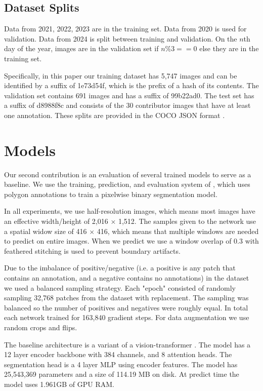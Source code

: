 \documentclass[10pt,twocolumn,letterpaper]{article}
\begin{document}
\subsection{Dataset Splits}

Data from 2021, 2022, 2023 are in the training set. Data from 2020 is used for
validation. Data from 2024 is split between training and validation. On the $n$th
day of the year, images are in the validation set if $n \% 3 == 0$ else they
are in the training set.

Specifically, in this paper our training dataset has 5,747 images and can be
identified by a suffix of 1e73d54f, which is the prefix of a hash of its
contents.  The validation set contains 691 images and has a suffix of 99b22ad0.
The test set has a suffix of d8988f8c and consists of the 30 contributor images
that have at least one annotation. These splits are provided in the
COCO JSON format \cite{lin_microsoft_2014}.

\section{Models}
\label{sec:models}

Our second contribution is an evaluation of several trained models to serve as
a baseline.  We use the training, prediction, and evaluation system of
\cite{Greenwell_2024_WACV, crall_geowatch_2024}, which uses polygon annotations
to train a pixelwise binary segmentation model.

In all experiments, we use half-resolution images, which means most images have
an effective width/height of 2,016 $\times$ 1,512. The samples given to the
network use a spatial widow size of 416 $\times$ 416, which means that multiple
windows are needed to predict on entire images. When we predict we use a window
overlap of 0.3 with feathered stitching is used to prevent boundary artifacts. 

Due to the imbalance of positive/negative (i.e. a positive is any patch that
contains an annotation, and a negative contains no annotations) in the dataset
we used a balanced sampling strategy.  Each "epoch" consisted of randomly
sampling 32,768 patches from the dataset with replacement.  The sampling was
balanced so the number of positives and negatives were roughly equal. In total
each network trained for 163,840 gradient steps. For data augmentation we use
random crops and flips.

The baseline architecture is a variant
\cite{bertasius2021space,Greenwell_2024_WACV} of a vision-transformer
\cite{dosovitskiy_image_2021}. The model has a 12 layer encoder backbone with
384 channels, and 8 attention heads. 
The segmentation head is a 4 layer MLP using encoder features.
The model has 25,543,369 parameters and a size of 114.19 MB on disk.
At predict time the model uses 1.961GB of GPU RAM.
\end{document}
